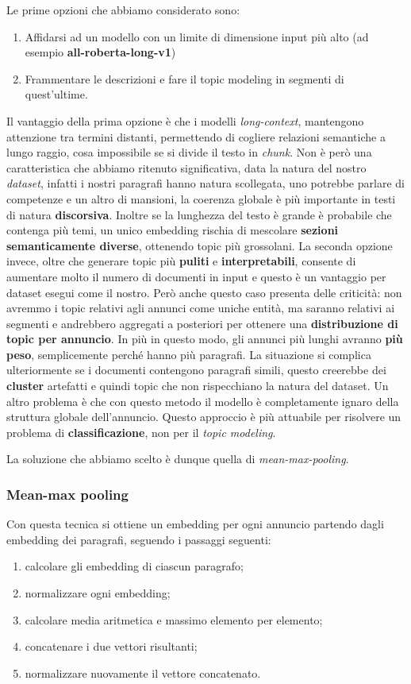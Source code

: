 \noindent Le prime opzioni che abbiamo considerato sono:
\begin{enumerate}
    \item Affidarsi ad un modello con un limite di dimensione input più alto (ad esempio \textbf{all-roberta-long-v1})
    \item Frammentare le descrizioni e fare il topic modeling in segmenti di quest'ultime.
\end{enumerate}
Il vantaggio della prima opzione è che i modelli \textit{long-context}, mantengono attenzione tra termini distanti, permettendo di cogliere relazioni semantiche a lungo raggio, cosa impossibile se si divide il testo in \textit{chunk}.
Non è però una caratteristica che abbiamo ritenuto significativa, data la natura del nostro \textit{dataset}, infatti i nostri paragrafi hanno natura scollegata, uno potrebbe parlare di competenze e un altro di mansioni, la coerenza globale è più importante in testi di natura \textbf{discorsiva}.
Inoltre se la lunghezza del testo è grande è probabile che contenga più temi, un unico embedding rischia di mescolare \textbf{sezioni semanticamente diverse}, ottenendo topic più grossolani.
La seconda opzione invece, oltre che generare topic più \textbf{puliti} e \textbf{interpretabili}, consente di aumentare molto il numero di documenti in input e questo è un vantaggio per dataset esegui come il nostro.
Però anche questo caso presenta delle criticità: non avremmo i topic relativi agli annunci come uniche entità, ma saranno relativi ai segmenti e andrebbero aggregati a posteriori per ottenere una \textbf{distribuzione di topic per annuncio}. In più in questo modo, gli annunci più lunghi avranno \textbf{più peso}, semplicemente perché hanno più paragrafi. La situazione si complica ulteriormente se i documenti contengono paragrafi simili, questo creerebbe dei \textbf{cluster} artefatti e quindi topic che non rispecchiano la natura del dataset. Un altro problema è che con questo metodo il modello è completamente ignaro della struttura globale dell'annuncio.
Questo approccio è più attuabile per risolvere un problema di \textbf{classificazione}, non per il \textit{topic modeling}.\medskip

\noindent La soluzione che abbiamo scelto è dunque quella di \textit{mean-max-pooling}.
\subsubsection{Mean-max pooling}

\noindent Con questa tecnica si ottiene un embedding per ogni annuncio partendo dagli embedding dei paragrafi, seguendo i passaggi seguenti:
\begin{enumerate}
    \item calcolare gli embedding di ciascun paragrafo;
    \item normalizzare ogni embedding;
    \item calcolare media aritmetica e massimo elemento per elemento;
    \item concatenare i due vettori risultanti;
    \item normalizzare nuovamente il vettore concatenato.
\end{enumerate}

